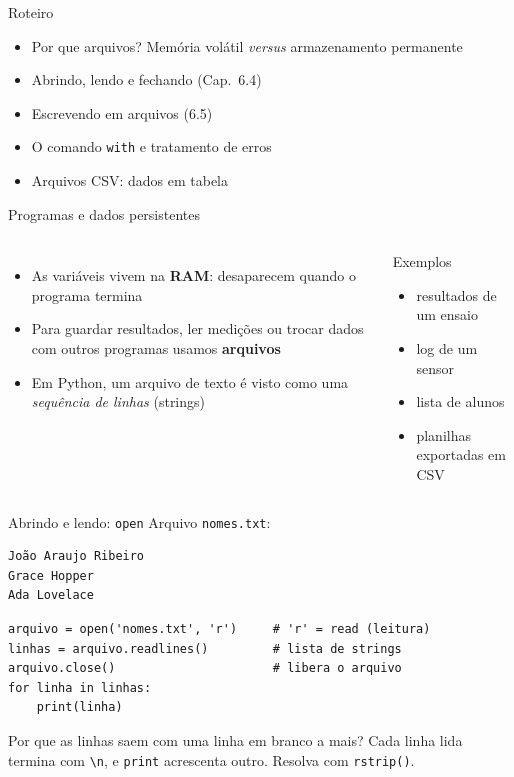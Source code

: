 \documentclass[aspectratio=169,10pt,t]{beamer}
\begin{document}
\capa

\begin{frame}{Roteiro}
  \begin{itemize}
    \item Por que arquivos? Memória volátil \emph{versus} armazenamento permanente
    \item Abrindo, lendo e fechando (Cap.~6.4)
    \item Escrevendo em arquivos (6.5)
    \item O comando \texttt{with} e tratamento de erros
    \item Arquivos CSV: dados em tabela
  \end{itemize}
\end{frame}

\begin{frame}{Programas e dados persistentes}
  \begin{columns}[T]
    \begin{itemize}
      \item As variáveis vivem na \textbf{RAM}: desaparecem quando o programa termina
      \item Para guardar resultados, ler medições ou trocar dados com outros programas usamos \textbf{arquivos}
      \item Em Python, um arquivo de texto é visto como uma \emph{sequência de linhas} (strings)
    \end{itemize}
    \begin{exampleblock}{Exemplos}
      \begin{itemize}\small
        \item resultados de um ensaio
        \item log de um sensor
        \item lista de alunos
        \item planilhas exportadas em CSV
      \end{itemize}
    \end{exampleblock}
  \end{columns}
\end{frame}

\begin{frame}[fragile]{Abrindo e lendo: \texttt{open}}
  Arquivo \texttt{nomes.txt}:
\begin{lstlisting}[style=saida]
João Araujo Ribeiro
Grace Hopper
Ada Lovelace
\end{lstlisting}
\begin{lstlisting}
arquivo = open('nomes.txt', 'r')     # 'r' = read (leitura)
linhas = arquivo.readlines()         # lista de strings
arquivo.close()                      # libera o arquivo
for linha in linhas:
    print(linha)
\end{lstlisting}
  \begin{alertblock}{Por que as linhas saem com uma linha em branco a mais?}
    Cada linha lida termina com \texttt{\textbackslash n}, e \texttt{print} acrescenta outro. Resolva com \texttt{rstrip()}.
  \end{alertblock}
\end{frame}
\end{document}
